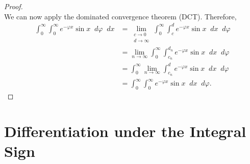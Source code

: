 \documentclass[a4paper]{article}
\newcommand*\diff{\mathop{}\!d} %
\theoremstyle{definition}
\begin{document}
\begin{proof}
\begin{equation*}
    \end{equation*}
    We can now apply the dominated convergence theorem (DCT).
    Therefore,
    \begin{align*}
        \int_{0}^{\infty} \int_{0}^{\infty} e^{-\varphi x} \sin x  \diff \varphi \diff x & = \lim_{\substack{c \to 0                                                                             \\ d \to \infty}}\int_{0}^{\infty} \int_{c}^{d} e^{-\varphi x} \sin x \diff x \diff \varphi \\
                                                                                         & = \lim_{n \to \infty} \int_{0}^{\infty} \int_{c_n}^{d_n} e^{-\varphi x} \sin x  \diff x \diff \varphi \\
                                                                                         & = \int_{0}^{\infty} \lim_{n \to \infty} \int_{c_n}^{d} e^{-\varphi x} \sin x  \diff x \diff \varphi   \\
                                                                                         & =\int_{0}^{\infty} \int_{0}^{\infty} e^{-\varphi x} \sin x  \diff x \diff \varphi.
    \end{align*}
\end{proof}

\section{Differentiation under the Integral Sign}
\end{document}
